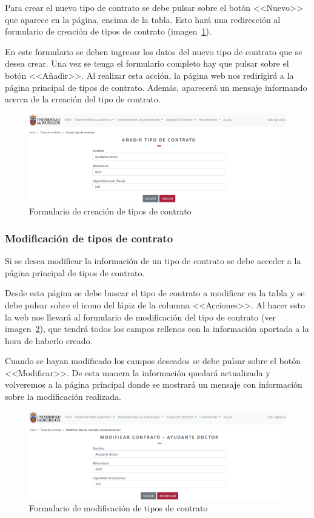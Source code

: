 Para crear el nuevo tipo de contrato se debe pulsar sobre el botón <<Nuevo>> que aparece en la página, encima de la tabla.
Esto hará una redirección al formulario de creación de tipos de contrato (imagen~\ref{pag:formContrato}).

En este formulario se deben ingresar los datos del nuevo tipo de contrato que se desea crear.
Una vez se tenga el formulario completo hay que pulsar sobre el botón <<Añadir>>.
Al realizar esta acción, la página web nos redirigirá a la página principal de tipos de contrato.
Además, aparecerá un mensaje informando acerca de la creación del tipo de contrato.

\begin{figure}
	\centering
	\includegraphics[width=\textwidth]{../img/Anexos/Manual usuario/formContrato.png}
	\caption{Formulario de creación de tipos de contrato}\label{pag:formContrato}
\end{figure}

\subsubsection{Modificación de tipos de contrato}
Si se desea modificar la información de un tipo de contrato se debe acceder a la página principal de tipos de contrato.

Desde esta página se debe buscar el tipo de contrato a modificar en la tabla y se debe pulsar sobre el icono del lápiz de la columna <<Acciones>>.
Al hacer esto la web nos llevará al formulario de modificación del tipo de contrato (ver imagen~\ref{pag:formModContrato}), que tendrá todos los campos rellenos con la información aportada a la hora de haberlo creado.

Cuando se hayan modificado los campos deseados se debe pulsar sobre el botón <<Modificar>>.
De esta manera la información quedará actualizada y volveremos a la página principal donde se mostrará un mensaje con información sobre la modificación realizada.

\begin{figure}
	\centering
	\includegraphics[width=\textwidth]{../img/Anexos/Manual usuario/formModContrato.png}
	\caption{Formulario de modificación de tipos de contrato}\label{pag:formModContrato}
\end{figure}

